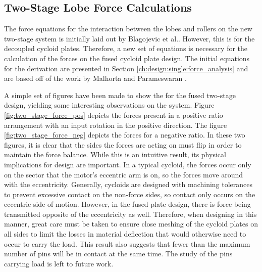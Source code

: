 \subsection{Two-Stage Lobe Force Calculations} \label{ch:dual:equtions:force}

The force equations for the interaction between the lobes and rollers on the new two-stage system is initially laid out by Blagojevic et al.\cite{ref:new_two_stage}. However, this is for the decoupled cycloid plates. Therefore, a new set of equations is necessary for the calculation of the forces on the fused cycloid plate design. The initial equations for the derivation are presented in Section \ref{ch:design:single:force_analysis} and are based off of the work by Malhorta and Parameswaran \cite{ref:malhorta_2}. 

A simple set of figures have been made to show the for the fused two-stage design, yielding some interesting observations on the system. Figure \ref{fig:two_stage_force_pos} depicts the forces present in a positive ratio arrangement with an input rotation in the positive direction. The figure \ref{fig:two_stage_force_neg} depicts the forces for a negative ratio. In these two figures, it is clear that the sides the forces are acting on must flip in order to maintain the force balance. While this is an intuitive result, its physical implications for design are important. In a typical cycloid, the forces occur only on the sector that the motor's eccentric arm is on, so the forces move around with the eccentricity. Generally, cycloids are designed with machining tolerances to prevent excessive contact on the non-force sides, so contact only occurs on the eccentric side of motion. However, in the fused plate design, there is force being transmitted opposite of the eccentricity as well. Therefore, when designing in this manner, great care must be taken to ensure close meshing of the cycloid plates on all sides to limit the losses in material deflection that would otherwise need to occur to carry the load. This result also suggests that fewer than the maximum number of pins will be in contact at the same time. The study of the pins carrying load is left to future work.

